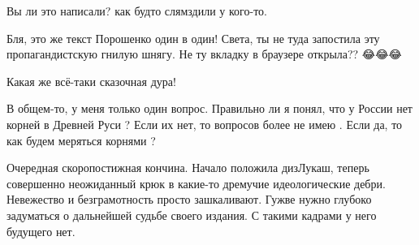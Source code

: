 \begin{itemize}
 

Вы ли это написали? как будто слямздили у кого-то.

 
Бля, это же текст Порошенко один в один! Света, ты не туда запостила эту пропагандистскую гнилую шнягу. Не ту вкладку в браузере открыла?? 😂😂😂

 
Какая же всё-таки сказочная дура!

 

В общем-то, у меня только один вопрос. Правильно ли я понял, что у России нет
корней в Древней Руси ? Если их нет, то вопросов более не имею . Если да, то
как будем меряться корнями ?


 

Очередная скоропостижная кончина. Начало положила дизЛукаш, теперь совершенно
неожиданный крюк в какие-то дремучие идеологические дебри. Невежество и
безграмотность просто зашкаливают. Гужве нужно глубоко задуматься о дальнейшей
судьбе своего издания. С такими кадрами у него будущего нет.

 


\end{itemize}
